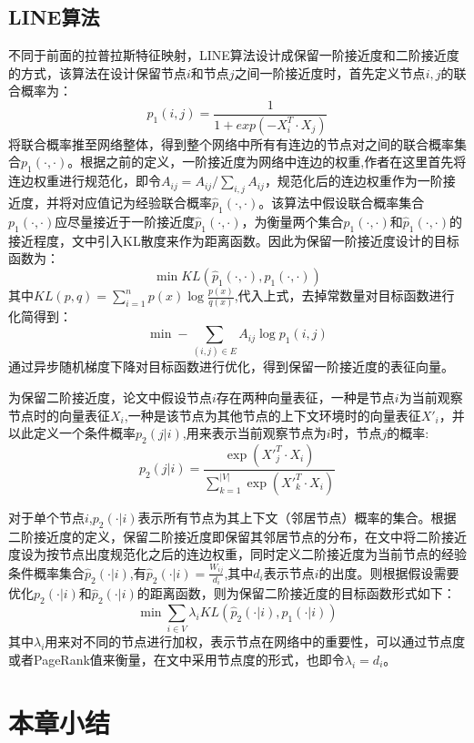\subsection{LINE算法}
 不同于前面的拉普拉斯特征映射，LINE算法设计成保留一阶接近度和二阶接近度的方式，该算法在设计保留节点$i$和节点$j$之间一阶接近度时，首先定义节点$i,j$的联合概率为：
 \begin{equation}
 p_1(i,j) = \frac{1}{1+exp(-X_i^T \cdot X_j)}
 \end{equation}
 将联合概率推至网络整体，得到整个网络中所有有连边的节点对之间的联合概率集合$p_1(\cdot,\cdot)$。根据之前的定义，一阶接近度为网络中连边的权重,作者在这里首先将连边权重进行规范化，即令$A_{ij} =A_{ij}/\sum_{i,j}A_{ij} $，规范化后的连边权重作为一阶接近度，并将对应值记为经验联合概率$\hat{p}_1(\cdot,\cdot)$。该算法中假设联合概率集合$p_1(\cdot,\cdot)$应尽量接近于一阶接近度$\hat{p}_1(\cdot,\cdot)$，为衡量两个集合$p_1(\cdot, \cdot)$和$\hat{p}_1(\cdot,\cdot)$的接近程度，文中引入KL散度来作为距离函数。因此为保留一阶接近度设计的目标函数为：
 \begin{equation}
 	\min KL(\hat{p}_1(\cdot, \cdot),p_1(\cdot,\cdot))
 \end{equation}
 其中$KL(p,q) = \sum_{i=1}^{n}p(x)\log\frac{p(x)}{q(x)}$,代入上式，去掉常数量对目标函数进行化简得到：
 \begin{equation}
 	\min - \sum_{(i,j) \in E} A_{ij}\log p_1(i,j)
 \end{equation}
 通过异步随机梯度下降对目标函数进行优化，得到保留一阶接近度的表征向量。
 
 为保留二阶接近度，论文中假设节点$i$存在两种向量表征，一种是节点$i$为当前观察节点时的向量表征$X_i$,一种是该节点为其他节点的上下文环境时的向量表征$X'_i$，并以此定义一个条件概率$p_2(j|i)$,用来表示当前观察节点为$i$时，节点$j$的概率:
 \begin{equation}
 	p_2(j|i) = \frac{\exp(X\prime_j^T \cdot X_i)}{\sum_{k=1}^{|V|}\exp(X\prime_k^T \cdot X_i)}
 \end{equation}
 
 对于单个节点$i$,$p_2(\cdot|i)$表示所有节点为其上下文（邻居节点）概率的集合。根据二阶接近度的定义，保留二阶接近度即保留其邻居节点的分布，在文中将二阶接近度设为按节点出度规范化之后的连边权重，同时定义二阶接近度为当前节点的经验条件概率集合$\hat{p}_2(\cdot|i)$,有$\hat{p}_2(\cdot|i) = \frac{W_{ij}}{d_i}$,其中$d_i$表示节点$i$的出度。则根据假设需要优化$p_2(\cdot|i)$和$\hat{p}_2(\cdot|i)$的距离函数，则为保留二阶接近度的目标函数形式如下：
 \begin{equation}
 \min \sum_{i \in V}\lambda_i KL(\hat{p}_2(\cdot|i),p_1(\cdot|i))
 \end{equation}
 其中$\lambda_i$用来对不同的节点进行加权，表示节点在网络中的重要性，可以通过节点度或者PageRank\cite{page1999pagerank}值来衡量，在文中采用节点度的形式，也即令$\lambda_i=d_i$。
 
\section{本章小结}





	